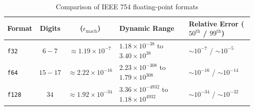 \begin{table}
\centering
\small
\caption{Comparison of IEEE 754 floating-point formats\cite{IEEE754_2019}}
\label{tab:floating_point_comparison}
\begin{tabularx}{\textwidth}{l c c X X}
\toprule
\textbf{Format} & \textbf{Digits} & \textbf{($\epsilon_{\text{mach}}$)} & \textbf{Dynamic Range} & \textbf{Relative Error ($50^{\text{th}}$ / $99^{\text{th}}$)} \\
\midrule
\texttt{f32}  & $6-7$   & $\approx 1.19 \times 10^{-7}$  & $1.18 \times 10^{-38}$   to $3.40 \times 10^{38}$   & $\sim 10^{-7}$  / $\sim 10^{-5}$  \\
\texttt{f64}  & $15-17$ & $\approx 2.22 \times 10^{-16}$ & $2.23 \times 10^{-308}$  to $1.79 \times 10^{308}$  & $\sim 10^{-16}$ / $\sim 10^{-14}$ \\
\texttt{f128} & $34$    & $\approx 1.92 \times 10^{-34}$ & $3.36 \times 10^{-4932}$ to $1.18 \times 10^{4932}$ & $\sim 10^{-34}$ / $\sim 10^{-32}$ \\
\bottomrule
\end{tabularx}
\end{table}

